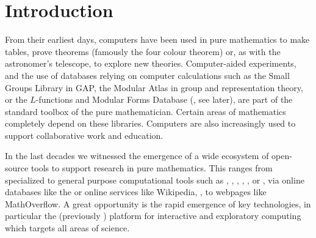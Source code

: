 \section{Introduction}

From their earliest days, computers have been used in pure mathematics to make
tables, prove theorems (famously the four colour theorem) or, as with the astronomer's
telescope, to explore new theories. Computer-aided experiments, and the use of databases
relying on computer calculations such as the Small Groups Library in GAP, the Modular
Atlas in group and representation theory, or the $L$-functions and Modular Forms Database
(\LMFDB, see later), are part of the standard toolbox of the pure mathematician. Certain
areas of mathematics completely depend on these libraries.
Computers are also increasingly used to support collaborative work and education.

In the last decades we witnessed the emergence of a wide ecosystem of open-source tools to
support research in pure mathematics. This ranges from specialized to general purpose
computational tools such as \GAP, \PariGP, \Linbox, \MPIR, \Sage, or \Singular, via online
databases like the \LMFDB or online services like Wikipedia,
\Arxiv, to webpages like MathOverflow.
A great opportunity is the rapid emergence of key technologies,
in particular the \Jupyter (previously \IPython) platform for interactive and
exploratory computing which targets all areas of science.


